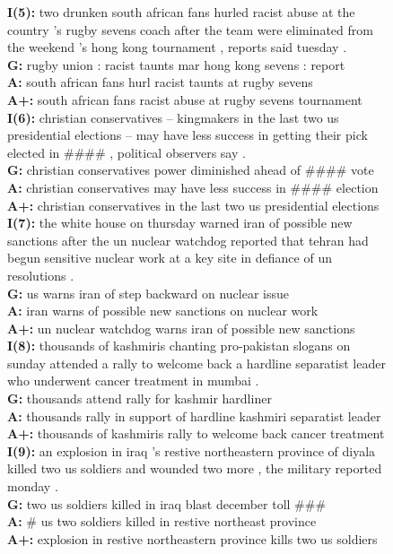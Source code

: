 \documentclass[11pt,a4paper]{article}
\begin{document}
\begin{figure}
\begin{framed}
\textbf{I(5):} two drunken south african fans hurled racist abuse at the country 's rugby sevens coach after the team were eliminated from the weekend 's hong kong tournament , reports said tuesday . \\
\textbf{G:} rugby union : racist taunts mar hong kong sevens : report \\
\textbf{A:} south african fans hurl racist taunts at rugby sevens \\
\textbf{A+:} south african fans racist abuse at rugby sevens tournament \\

\textbf{I(6):} christian conservatives -- kingmakers in the last two us presidential elections -- may have less success in getting their pick elected in \#\#\#\# , political observers say . \\
\textbf{G:} christian conservatives power diminished ahead of \#\#\#\# vote \\
\textbf{A:} christian conservatives may have less success in \#\#\#\# election \\
\textbf{A+:} christian conservatives in the last two us presidential elections \\

\textbf{I(7):} the white house on thursday warned iran of possible new sanctions after the un nuclear watchdog reported that tehran had begun sensitive nuclear work at a key site in defiance of un resolutions . \\
\textbf{G:} us warns iran of step backward on nuclear issue \\
\textbf{A:} iran warns of possible new sanctions on nuclear work \\
\textbf{A+:} un nuclear watchdog warns iran of possible new sanctions \\

\textbf{I(8):} thousands of kashmiris chanting pro-pakistan slogans on sunday attended a rally to welcome back a hardline separatist leader who underwent cancer treatment in mumbai . \\
\textbf{G:} thousands attend rally for kashmir hardliner \\
\textbf{A:} thousands rally in support of hardline kashmiri separatist leader \\
\textbf{A+:} thousands of kashmiris rally to welcome back cancer treatment \\

\textbf{I(9):} an explosion in iraq 's restive northeastern province of diyala killed two us soldiers and wounded two more , the military reported monday . \\
\textbf{G:} two us soldiers killed in iraq blast december toll \#\#\# \\
\textbf{A:} \# us two soldiers killed in restive northeast province \\
\textbf{A+:} explosion in restive northeastern province kills two us soldiers \\


\end{framed}
\end{figure}
\end{document}
